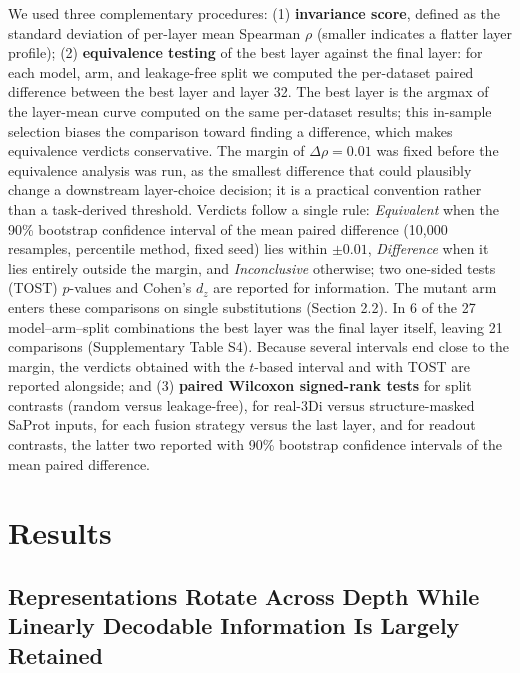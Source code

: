 \documentclass[11pt,a4paper]{article}
\newcommand{\rtwo}[1]{#1}
\newcommand{\rthree}[1]{#1}
\begin{document}
We used three complementary \rtwo{procedures}: (1) \textbf{invariance score}, defined as
the standard deviation of per-layer mean Spearman $\rho$ (smaller indicates a
\rtwo{flatter layer profile});
\rtwo{(2) \textbf{equivalence testing} of the best layer against the final layer: for
each model, arm, and leakage-free split we computed the per-dataset paired difference
between the best layer and layer 32. The best layer is the argmax of the layer-mean
curve computed on the same per-dataset results; this in-sample selection biases the
comparison toward finding a difference, which makes equivalence verdicts conservative.
The margin of $\Delta\rho = 0.01$ was fixed before the equivalence analysis was run, as
the smallest difference that could plausibly change a downstream layer-choice
decision; it is a practical convention rather than a task-derived threshold. Verdicts
follow a single rule: \emph{Equivalent} when the 90\%
bootstrap confidence interval of the mean paired difference (10,000 resamples,
percentile method, fixed seed) lies within $\pm 0.01$, \emph{Difference} when it lies
entirely outside the margin, and \emph{Inconclusive} otherwise; two one-sided tests
(TOST) $p$-values and Cohen's $d_z$ are reported for information. \rthree{The mutant arm enters these
comparisons on single substitutions (Section 2.2). In 6 of the 27
model--arm--split combinations the best layer was the final layer itself, leaving 21
comparisons (Supplementary Table S4). Because several intervals end close to the
margin, the verdicts obtained with the $t$-based interval and with TOST are reported
alongside;}} and (3) \textbf{paired Wilcoxon signed-rank tests}
for split contrasts (random versus leakage-free)\rtwo{,} for real-3Di versus
structure-masked SaProt inputs\rtwo{, for each fusion strategy versus the last layer,
and for readout contrasts, the latter two reported with 90\% bootstrap confidence
intervals of the mean paired difference}.

\section{Results}

\subsection{\rtwo{Representations Rotate Across Depth While Linearly Decodable Information Is Largely Retained}}
\end{document}
